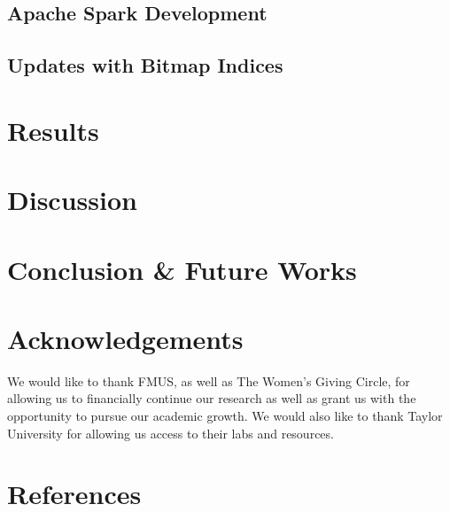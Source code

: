 \documentclass{article}
\begin{document}
\subsection{Apache Spark Development}
\justify

\subsection{Updates with Bitmap Indices}
\justify

%
%
\section{Results}
\justify
%
%
\section{Discussion}
\justify
%
%
\section{Conclusion \& Future Works}
\justify

%
%
\section{Acknowledgements}
\justify

We would like to thank FMUS, as well as The Women’s Giving Circle, for allowing us to financially continue our research as well as grant us with the opportunity to pursue our  academic growth. We would also like to thank Taylor University for allowing us access to their labs and resources. \cite{bbcCompression95} \par

%
%
\section{References}
\justify



\end{document}
